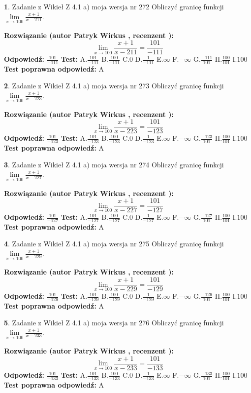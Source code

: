 \documentclass[12pt, a4paper]{article}
\theoremstyle{definition} %
\newtheorem{zad}{}
\newcommand{\zadStart}[1]{\begin{zad}#1\newline}
\newcommand{\zadStop}{\end{zad}}
\newcommand{\rozwStart}[2]{\noindent \textbf{Rozwiązanie (autor #1 , recenzent #2): }\newline}
\newcommand{\rozwStop}{\newline}
\newcommand{\odpStart}{\noindent \textbf{Odpowiedź:}\newline}
\newcommand{\odpStop}{\newline}
\newcommand{\testStart}{\noindent \textbf{Test:}\newline}
\newcommand{\testStop}{\newline}
\newcommand{\kluczStart}{\noindent \textbf{Test poprawna odpowiedź:}\newline}
\newcommand{\kluczStop}{\newline}
\begin{document}
\zadStart{Zadanie z Wikieł Z 4.1 a) moja wersja nr 272}
Obliczyć granicę funkcji $\lim\limits_{x\to100}\frac{x+1}{x-211}$.
\zadStop
\rozwStart{Patryk Wirkus}{}
$$\lim\limits_{x\to100}\frac{x+1}{x-211} = \frac{101}{-111}$$
\rozwStop
\odpStart
$\frac{101}{-111}$
\odpStop
\testStart
A.$\frac{101}{-111}$
B.$\frac{100}{-111}$
C.$0$
D.$\frac{1}{-111}$
E.$\infty$
F.$-\infty$
G.$\frac{-111}{101}$
H.$\frac{100}{101}$
I.$100$
\testStop
\kluczStart
A
\kluczStop



\zadStart{Zadanie z Wikieł Z 4.1 a) moja wersja nr 273}
Obliczyć granicę funkcji $\lim\limits_{x\to100}\frac{x+1}{x-223}$.
\zadStop
\rozwStart{Patryk Wirkus}{}
$$\lim\limits_{x\to100}\frac{x+1}{x-223} = \frac{101}{-123}$$
\rozwStop
\odpStart
$\frac{101}{-123}$
\odpStop
\testStart
A.$\frac{101}{-123}$
B.$\frac{100}{-123}$
C.$0$
D.$\frac{1}{-123}$
E.$\infty$
F.$-\infty$
G.$\frac{-123}{101}$
H.$\frac{100}{101}$
I.$100$
\testStop
\kluczStart
A
\kluczStop



\zadStart{Zadanie z Wikieł Z 4.1 a) moja wersja nr 274}
Obliczyć granicę funkcji $\lim\limits_{x\to100}\frac{x+1}{x-227}$.
\zadStop
\rozwStart{Patryk Wirkus}{}
$$\lim\limits_{x\to100}\frac{x+1}{x-227} = \frac{101}{-127}$$
\rozwStop
\odpStart
$\frac{101}{-127}$
\odpStop
\testStart
A.$\frac{101}{-127}$
B.$\frac{100}{-127}$
C.$0$
D.$\frac{1}{-127}$
E.$\infty$
F.$-\infty$
G.$\frac{-127}{101}$
H.$\frac{100}{101}$
I.$100$
\testStop
\kluczStart
A
\kluczStop



\zadStart{Zadanie z Wikieł Z 4.1 a) moja wersja nr 275}
Obliczyć granicę funkcji $\lim\limits_{x\to100}\frac{x+1}{x-229}$.
\zadStop
\rozwStart{Patryk Wirkus}{}
$$\lim\limits_{x\to100}\frac{x+1}{x-229} = \frac{101}{-129}$$
\rozwStop
\odpStart
$\frac{101}{-129}$
\odpStop
\testStart
A.$\frac{101}{-129}$
B.$\frac{100}{-129}$
C.$0$
D.$\frac{1}{-129}$
E.$\infty$
F.$-\infty$
G.$\frac{-129}{101}$
H.$\frac{100}{101}$
I.$100$
\testStop
\kluczStart
A
\kluczStop



\zadStart{Zadanie z Wikieł Z 4.1 a) moja wersja nr 276}
Obliczyć granicę funkcji $\lim\limits_{x\to100}\frac{x+1}{x-233}$.
\zadStop
\rozwStart{Patryk Wirkus}{}
$$\lim\limits_{x\to100}\frac{x+1}{x-233} = \frac{101}{-133}$$
\rozwStop
\odpStart
$\frac{101}{-133}$
\odpStop
\testStart
A.$\frac{101}{-133}$
B.$\frac{100}{-133}$
C.$0$
D.$\frac{1}{-133}$
E.$\infty$
F.$-\infty$
G.$\frac{-133}{101}$
H.$\frac{100}{101}$
I.$100$
\testStop
\kluczStart
A
\kluczStop
\end{document}
